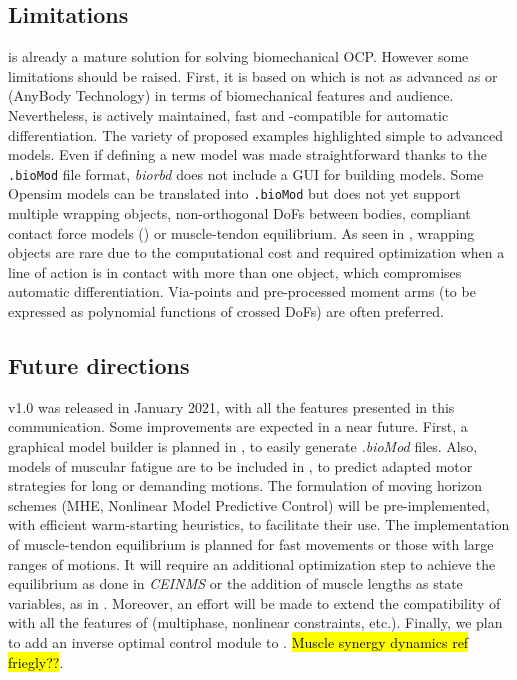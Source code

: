 \subsection{Limitations}

\bioptim is already a mature solution for solving biomechanical OCP. 
However some limitations should be raised. 
First, it is based on  \biorbd which is not as advanced as \opensim or \anybody (AnyBody Technology) in terms of biomechanical features and audience.
Nevertheless,  \biorbd is actively maintained, fast and \casadi-compatible for automatic differentiation.
The variety of proposed examples highlighted simple to advanced models.
Even if defining a new model was made straightforward thanks to the \texttt{.bioMod} file format, \textit{biorbd} does not include a GUI for building models. 
Some Opensim models can be translated into \texttt{.bioMod} but \biorbd does not yet support multiple wrapping objects, non-orthogonal DoFs between bodies, compliant contact force models (\cite{serrancoli2019subject}) or muscle-tendon equilibrium. 
As seen in \cite{dembia2020opensim}, wrapping objects are rare due to the computational cost and required optimization when a line of action is in contact with more than one object, which compromises automatic differentiation. 
Via-points and pre-processed moment arms \cite{van2011implicit} (to be expressed as polynomial functions of crossed DoFs) are often preferred. 

\subsection{Future directions}

\bioptim v1.0 was released in January 2021, with all the features presented in this communication.
Some improvements are expected in a near future.
First, a graphical model builder is planned in \biorbd, to easily generate \textit{.bioMod} files.
Also, models of muscular fatigue are to be included in \bioptim, to predict adapted motor strategies for long or demanding motions.
The formulation of moving horizon schemes (MHE, Nonlinear Model Predictive Control) will be pre-implemented, with efficient warm-starting heuristics, to facilitate their use.
The implementation of muscle-tendon equilibrium is planned for fast movements or those with large ranges of motions. 
It will require an additional optimization step to achieve the equilibrium as done in \textit{CEINMS} \cite{pizzolato2015ceinms} or the addition of muscle lengths as state variables, as in \cite{van2011implicit}.  
Moreover, an effort will be made to extend the compatibility of \acados with all the features of \bioptim (multiphase, nonlinear constraints, etc.). 
Finally, we plan to add an inverse optimal control module to \bioptim.
\hl{Muscle synergy dynamics ref friegly??}.